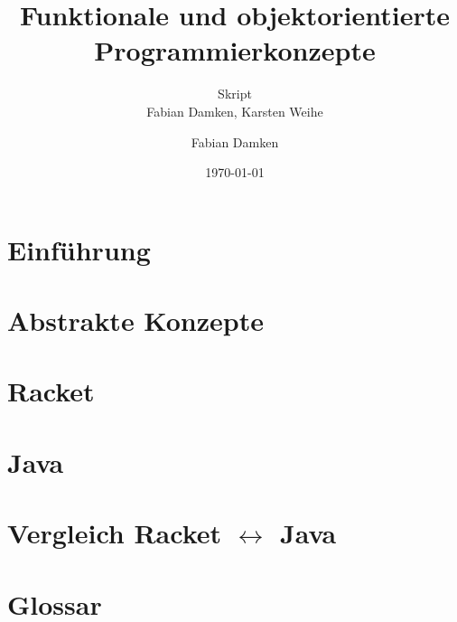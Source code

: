 \documentclass[a4paper, 11pt, accentcolor = tud3b]{tudreport}
\title{Funktionale und objektorientierte Programmierkonzepte}
\subtitle{Skript \\ Fabian Damken, Karsten Weihe}
\author{Fabian Damken}
\date{\today}
\begin{document}
	

    \maketitle
    \tableofcontents
    \listoftodos

    \chapter{Einführung}
        

	\chapter{Abstrakte Konzepte}
		

    \chapter{Racket}
        

    \chapter{Java}
        
    
    \chapter{Vergleich Racket $ \leftrightarrow $ Java}
	    

    \chapter{Glossar}
    
    
\end{document}
